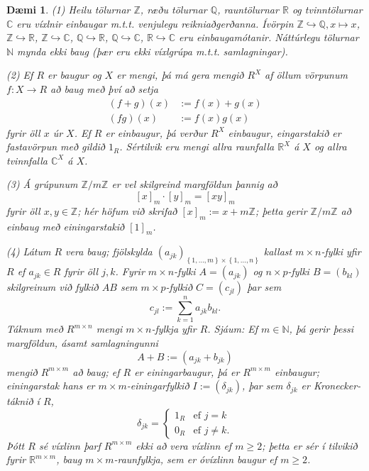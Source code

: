 \documentclass[a4paper,icelandic,11pt]{book}
\theoremstyle{plain}
\newtheorem{daemi}{Dæmi}[chapter]
\newcommand{\R}{\mathbb{R}}
\newcommand{\N}{\mathbb{N}}
\newcommand{\Z}{\mathbb{Z}}
\newcommand{\Q}{\mathbb{Q}}
\newcommand{\C}{\mathbb{C}}
\begin{document}
\begin{daemi}
  (1) Heilu tölurnar $\Z$, ræðu tölurnar $\Q$, rauntölurnar $\R$ og
  tvinntölurnar $\C$ eru víxlnir einbaugar m.t.t. venjulegu reikniaðgerðanna.
  Ívörpin $\Z\hookrightarrow\Q,x\mapsto x$, $\Z\hookrightarrow\R$,
  $\Z\hookrightarrow\C$, $\Q\hookrightarrow\R$, $\Q\hookrightarrow\C$,
  $\R\hookrightarrow\C$ eru einbaugamótanir. Náttúrlegu tölurnar $\N$ mynda ekki
  baug (þær eru ekki víxlgrúpa m.t.t. samlagningar).
  
  (2) Ef $R$ er baugur og $X$ er mengi, þá má gera mengið $R^X$ af öllum
  vörpunum $f:X\to R$ að baug með því að setja
  \begin{align*}
      (f+g)(x) &:= f(x) + g(x)
      \\
      (fg)(x)  &:= f(x)g(x)
  \end{align*}
  fyrir öll $x$ úr $X$. Ef $R$ er einbaugur, þá verður $R^X$ einbaugur,
  eingarstakið er fastavörpun með gildið $1_R$. Sértilvik eru mengi allra
  raunfalla $\R^X$ á $X$ og allra tvinnfalla $\C^X$ á $X$.
  
  (3) Á grúpunum $\Z/m\Z$ er vel skilgreind margföldun þannig að
  \[
    [x]_m\cdot [y]_m = [xy]_m
  \]
  fyrir öll $x,y\in\Z$; hér höfum við skrifað $[x]_m := x+ m\Z$; þetta gerir
  $\Z/m\Z$ að einbaug með einingarstakið $[1]_m$.
  
  (4) Látum $R$ vera baug; fjölskylda 
  $(a_{jk})_{ \left\{ 1,\dots,m \right\}\times\left\{ 1,\dots,n \right\} }$
  kallast $m\times n$-fylki yfir $R$ ef $a_{jk}\in R$ fyrir öll $j,k$. Fyrir
  $m\times n$-fylki $A =(a_{jk})$ og $n\times p$-fylki $B = (b_{kl})$ 
  skilgreinum við fylkið $AB$ sem $m\times p$-fylkið $C=(c_{jl})$ þar sem
  \[
    c_{jl} := \sum_{k=1}^n a_{jk} b_{kl}.
  \]
  Táknum með $R^{m\times n}$ mengi $m\times n$-fylkja yfir $R$. Sjáum: Ef
  $m\in \N$, þá gerir þessi margföldun, ásamt samlagningunni
  \[
    A+B := (a_{jk} + b_{jk})
  \]
  mengið $R^{m\times m}$ að baug; ef $R$ er einingarbaugur, þá er 
  $R^{m\times m}$ einbaugur; einingarstak hans er $m\times m$-einingarfylkið
  $I := (\delta_{jk})$, þar sem $\delta_{jk}$ er \emph{Kronecker-táknið}
   í $R$,
  \[
    \delta_{jk} = \begin{cases}
      1_R & \text{ef } j = k \\
      0_R & \text{ef } j\neq k.
    \end{cases}
  \]
  Þótt $R$ sé víxlinn þarf $R^{m\times m}$ ekki að vera víxlinn ef $m\geq 2$;
  þetta er sér í tilvikið fyrir $\R^{m\times m}$, baug $m\times m$-raunfylkja,
  sem er óvíxlinn baugur ef $m\geq 2$.
\end{daemi}
\end{document}
